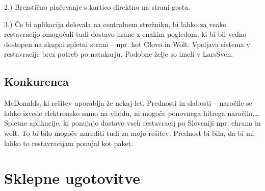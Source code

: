 \documentclass[a4paper, 12pt]{book}
\begin{document}
2.) Brezstično plačevanje s kartico direktno na strani gosta.

3.) Če bi aplikacija delovala na centralnem strežniku, bi lahko za vsako restavracijo omogočali tudi dostavo hrane z enakim pogledom, ki bi bil vedno dostopen na skupni spletni strani – npr. kot Glovo in Wolt.
Vpeljava sistema v restavracije brez potreb po natakarju. Podobne želje so imeli v LarsSven.  


\section{Konkurenca}

McDonalds, ki rešitev uporablja že nekaj let. Prednosti in slabosti – naročile se lahko izvede elektronsko samo na vhodu, ni mogoče ponovnega hitrega naročila,… 
Spletne aplikacije, ki ponujajo dostavo vseh restavracij po Sloveniji npr. ehrana in wolt. To bi bilo mogoče narediti tudi za mojo rešitev. Prednost bi bila, da bi mi lahko to restavracijam ponujal kot paket.

\chapter {Sklepne ugotovitve}
\newpage %
\ \\
\clearpage
{}


\end{document}
